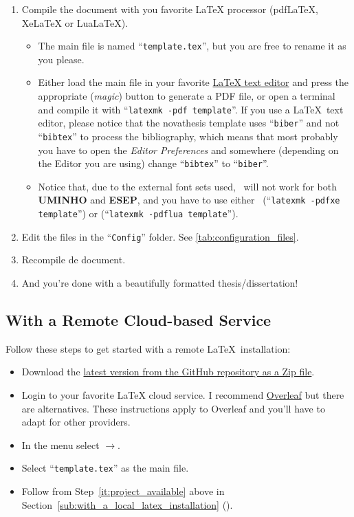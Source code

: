 \begin{enumerate}
  \item Compile the document with you favorite LaTeX processor (pdfLaTeX, XeLaTeX or LuaLaTeX).
  \begin{itemize}
    \item The main file is named “\verb!template.tex!”, but you are free to rename it as you please.
    \item Either load the main file in your favorite \href{https://en.wikipedia.org/wiki/Comparison_of_TeX_editors}{LaTeX text editor} and press the appropriate (\emph{magic}) button to generate a PDF file, or open a terminal and compile it with “\verb!latexmk -pdf template!”. If you use a \LaTeX\ text editor, please notice that the \gls{novathesis} template uses “\verb!biber!” and not “\verb!bibtex!” to process the bibliography, which means that most probably you have to open the \emph{Editor Preferences} and somewhere (depending on the Editor you are using) change “\verb!bibtex!” to “\verb!biber!”.
    \item Notice that, due to the external font sets used, \pdfLaTeX\ will not work for both \textbf{UMINHO} and \textbf{ESEP}, and you have to use either \XeLaTeX\ (“\verb!latexmk -pdfxe template!”) or \LuaLaTeX (“\verb!latexmk -pdflua template!”).
  \end{itemize}
  \item Edit the files in the “\texttt{Config}” folder.  See \autoref{tab:configuration_files}.
  \item Recompile de document.
  \item And you're done with a beautifully formatted thesis/dissertation! {\setlength{\twemojiDefaultHeight}{1.5\twemojiDefaultHeight}\emojiSmile}
\end{enumerate}


\subsection{With a Remote Cloud-based Service} %
\label{sub:with_a_remote_cloud_based_service}

Follow these steps to get started with a remote \LaTeX\ installation:

\begin{itemize}
  \item Download the \href{https://github.com/joaomlourenco/novathesis/archive/main.zip}{latest version from the GitHub repository as a Zip file}.
  \item Login to your favorite LaTeX cloud service. I recommend \href{https://www.overleaf.com/?r=f5160636&rm=d&rs=b}{Overleaf} but there are alternatives. These instructions apply to Overleaf and you'll have to adapt for other providers.
  \item In the menu select $\rightarrow$.
  \item Select “\verb!template.tex!” as the main file.
  \item Follow from Step~\ref{it:project_available} above in Section~\ref{sub:with_a_local_latex_installation} ().
\end{itemize}

